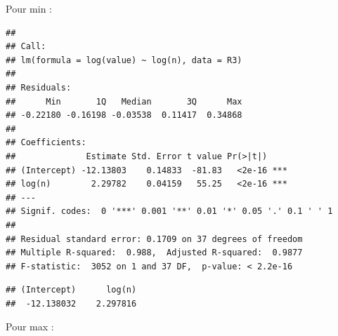 \documentclass[
]{article}
\newenvironment{Shaded}{\begin{snugshade}}{\end{snugshade}}
\newcommand{\AttributeTok}[1]{\textcolor[rgb]{0.77,0.63,0.00}{#1}}
\newcommand{\DecValTok}[1]{\textcolor[rgb]{0.00,0.00,0.81}{#1}}
\newcommand{\FunctionTok}[1]{\textcolor[rgb]{0.00,0.00,0.00}{#1}}
\newcommand{\NormalTok}[1]{#1}
\newcommand{\OtherTok}[1]{\textcolor[rgb]{0.56,0.35,0.01}{#1}}
\newcommand{\SpecialCharTok}[1]{\textcolor[rgb]{0.00,0.00,0.00}{#1}}
\newcommand{\StringTok}[1]{\textcolor[rgb]{0.31,0.60,0.02}{#1}}
\begin{document}
Pour min :

\begin{Shaded}
\end{Shaded}

\begin{verbatim}
## 
## Call:
## lm(formula = log(value) ~ log(n), data = R3)
## 
## Residuals:
##      Min       1Q   Median       3Q      Max 
## -0.22180 -0.16198 -0.03538  0.11417  0.34868 
## 
## Coefficients:
##              Estimate Std. Error t value Pr(>|t|)    
## (Intercept) -12.13803    0.14833  -81.83   <2e-16 ***
## log(n)        2.29782    0.04159   55.25   <2e-16 ***
## ---
## Signif. codes:  0 '***' 0.001 '**' 0.01 '*' 0.05 '.' 0.1 ' ' 1
## 
## Residual standard error: 0.1709 on 37 degrees of freedom
## Multiple R-squared:  0.988,  Adjusted R-squared:  0.9877 
## F-statistic:  3052 on 1 and 37 DF,  p-value: < 2.2e-16
\end{verbatim}

\begin{Shaded}
\end{Shaded}

\begin{verbatim}
## (Intercept)      log(n) 
##  -12.138032    2.297816
\end{verbatim}

Pour max :

\begin{Shaded}
\end{Shaded}
\end{document}
